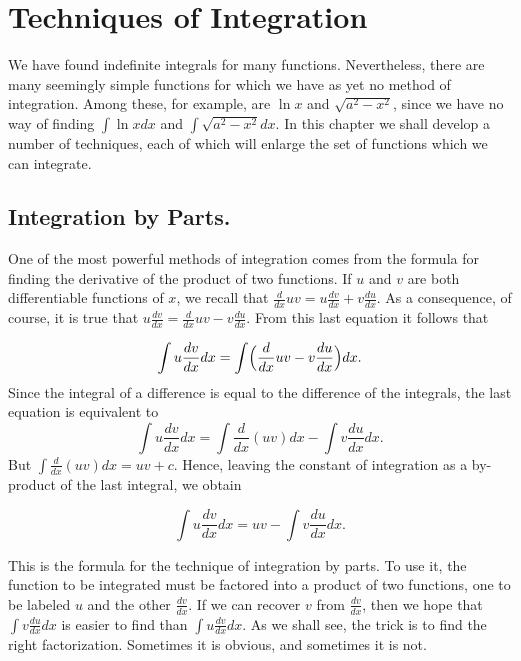 \chapter{Techniques of Integration} \label{chp 7}

We have found indefinite integrals for many functions. Nevertheless, there are many seemingly simple functions for which we have as yet no method of integration. Among these, for example, are $\ln x$ and $\sqrt{a^2 - x^2}$, since we have no way of finding $\int \ln x dx$ and $\int \sqrt{a^2 - x^2} dx$. In this chapter we shall develop a number of techniques, each of which will enlarge the set of functions which we can integrate.

\section{Integration by Parts.}\label{sec 7.1} 
One of the most powerful methods of integration comes from the formula for finding the derivative of the product of two functions. If $u$ and $v$ are both differentiable functions of $x$, we recall that $\frac{d}{dx} uv = u\frac{dv}{dx}+ v\frac{du}{dx}$. As a consequence, of course, it is true that $u \frac{dv}{dx} = \frac{d}{dx}uv - v \frac{du}{dx}$. From this last equation it follows that  

$$
\int u \frac{dv}{dx} dx  = \int  \Bigl(\frac{d}{dx} uv - v \frac{du}{dx} \Bigr) dx.
$$
\noindent Since the integral of a difference is equal to the difference of the integrals, the last equation is equivalent to
$$
\int u \frac{dv}{dx} dx =  \int \frac{d}{dx} (uv) dx - \int v \frac{du}{dx} dx.
$$
\noindent But $\int \frac{d}{dx}(uv) dx = uv + c$. Hence, leaving the constant of integration as a by-product of the last integral, we obtain

\begin{theorem} %
$$
\int u \frac{dv}{dx} dx = uv - \int v \frac{du}{dx} dx. 
$$
\end{theorem}

This is the formula for the technique of integration by parts. To use it, the function to be integrated must be factored into a product of two functions,
one to be labeled $u$ and the other $\frac{dv}{dx}$. If we can recover $v$ from $\frac{dv}{dx}$, then we hope that $\int v \frac{du}{dx} dx$ is easier to find than $\int u \frac{dv}{dx} dx$. As we shall see, the trick is to find the right factorization.  Sometimes it is obvious, and sometimes it is not.


